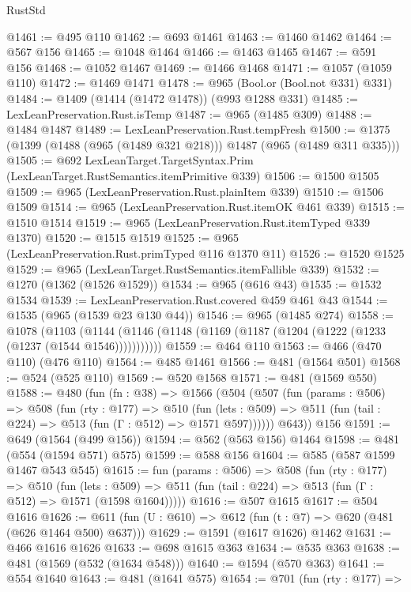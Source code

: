 \begin{lexlean}{RustStd}
\begin{coremodule}
{\begin{coremodule}
{{{{{{{@1461 := @495 @110
@1462 := @693 @1461
@1463 := @1460 @1462
@1464 := @567 @156
@1465 := @1048 @1464
@1466 := @1463 @1465
@1467 := @591 @156
@1468 := @1052 @1467
@1469 := @1466 @1468
@1471 := @1057 (@1059 @110)
@1472 := @1469 @1471
@1478 := @965 (Bool.or (Bool.not @331) @331)
@1484 := @1409 (@1414 (@1472 @1478)) (@993 @1288 @331)
@1485 := LexLeanPreservation.Rust.isTemp
@1487 := @965 (@1485 @309)
@1488 := @1484 @1487
@1489 := LexLeanPreservation.Rust.tempFresh
@1500 := @1375 (@1399 (@1488 (@965 (@1489 @321 @218))) @1487 (@965 (@1489 @311 @335)))
@1505 := @692 LexLeanTarget.TargetSyntax.Prim (LexLeanTarget.RustSemantics.itemPrimitive @339)
@1506 := @1500 @1505
@1509 := @965 (LexLeanPreservation.Rust.plainItem @339)
@1510 := @1506 @1509
@1514 := @965 (LexLeanPreservation.Rust.itemOK @461 @339)
@1515 := @1510 @1514
@1519 := @965 (LexLeanPreservation.Rust.itemTyped @339 @1370)
@1520 := @1515 @1519
@1525 := @965 (LexLeanPreservation.Rust.primTyped @116 @1370 @11)
@1526 := @1520 @1525
@1529 := @965 (LexLeanTarget.RustSemantics.itemFallible @339)
@1532 := @1270 (@1362 (@1526 @1529))
@1534 := @965 (@616 @43)
@1535 := @1532 @1534
@1539 := LexLeanPreservation.Rust.covered @459 @461 @43
@1544 := @1535 (@965 (@1539 @23 @130 @44))
@1546 := @965 (@1485 @274)
@1558 := @1078
    (@1103 (@1144 (@1146 (@1148 (@1169 (@1187 (@1204 (@1222 (@1233 (@1237 (@1544 @1546)))))))))))
@1559 := @464 @110
@1563 := @466 (@470 @110) (@476 @110)
@1564 := @485 @1461
@1566 := @481 (@1564 @501)
@1568 := @524 (@525 @110)
@1569 := @520 @1568
@1571 := @481 (@1569 @550)
@1588 := @480
    (fun (fn : @38) =>
    @1566
      (@504
        (@507
          (fun (params : @506) =>
          @508
            (fun (rty : @177) =>
            @510
              (fun (lets : @509) =>
              @511 (fun (tail : @224) => @513 (fun (Γ : @512) => @1571 @597))))))
        @643))
    @156
@1591 := @649 (@1564 (@499 @156))
@1594 := @562 (@563 @156) @1464
@1598 := @481 (@554 (@1594 @571) @575)
@1599 := @588 @156
@1604 := @585 (@587 @1599 @1467 @543 @545)
@1615 := fun (params : @506) =>
  @508
    (fun (rty : @177) =>
    @510
      (fun (lets : @509) =>
      @511 (fun (tail : @224) => @513 (fun (Γ : @512) => @1571 (@1598 @1604)))))
@1616 := @507 @1615
@1617 := @504 @1616
@1626 := @611 (fun (U : @610) => @612 (fun (t : @7) => @620 (@481 (@626 @1464 @500) @637)))
@1629 := @1591 (@1617 @1626) @1462
@1631 := @466 @1616 @1626
@1633 := @698 @1615 @363
@1634 := @535 @363
@1638 := @481 (@1569 (@532 (@1634 @548)))
@1640 := @1594 (@570 @363)
@1641 := @554 @1640
@1643 := @481 (@1641 @575)
@1654 := @701
    (fun (rty : @177) =>
}}}}}}}
\end{coremodule}}
\end{coremodule}
\end{lexlean}
